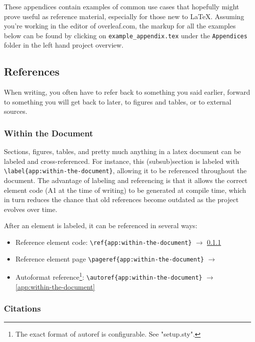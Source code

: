 
These appendices contain examples of common use cases that hopefully might prove useful as reference material, especially for those new to LaTeX.
Assuming you're working in the editor of overleaf.com, the markup for all the examples below can be found by clicking on \verb|example_appendix.tex| under the \verb|Appendices| folder in the left hand project overview.


\subsection{References}


When writing, you often have to refer back to something you said earlier, forward to something you will get back to later, to figures and tables, or to external sources.

\subsubsection{Within the Document}
\label{app:within-the-document}

Sections, figures, tables, and pretty much anything in a latex document can be labeled and cross-referenced.
For instance, this (subsub)section is labeled with \verb|\label{app:within-the-document}|, allowing it to be referenced throughout the document.
The advantage of labeling and referencing is that it allows the correct element code (A1 at the time of writing) to be generated at compile time, which in turn reduces the chance that old references become outdated as the project evolves over time.

After an element is labeled, it can be referenced in several ways:

\begin{itemize}
    \item Reference element code: \verb|\ref{app:within-the-document}| $\rightarrow$ \ref{app:within-the-document}
    \item Reference element page \verb|\pageref{app:within-the-document}| $\rightarrow$ \pageref{app:within-the-document}
    \item Autoformat reference\footnote{The exact format of autoref is configurable. See "setup.sty".}: \verb|\autoref{app:within-the-document}| $\rightarrow$ \autoref{app:within-the-document}
\end{itemize}

\subsubsection{Citations}

